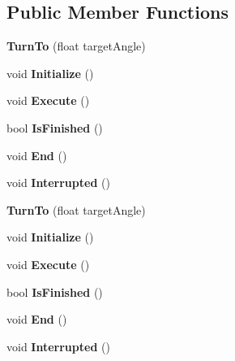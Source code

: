 \subsection*{Public Member Functions}
\begin{DoxyCompactItemize}
\item 
\hypertarget{class_turn_to_aa74a4bd0785dce24fdda1e1bf79cd39b}{}{\bfseries Turn\+To} (float target\+Angle)\label{class_turn_to_aa74a4bd0785dce24fdda1e1bf79cd39b}

\item 
\hypertarget{class_turn_to_a1573bc8d8345d2dbe40866937d4e41a1}{}void {\bfseries Initialize} ()\label{class_turn_to_a1573bc8d8345d2dbe40866937d4e41a1}

\item 
\hypertarget{class_turn_to_ae60afcdabfc0510abf2718f89919e8df}{}void {\bfseries Execute} ()\label{class_turn_to_ae60afcdabfc0510abf2718f89919e8df}

\item 
\hypertarget{class_turn_to_a645fa93286ea2657ec45166ec9a10662}{}bool {\bfseries Is\+Finished} ()\label{class_turn_to_a645fa93286ea2657ec45166ec9a10662}

\item 
\hypertarget{class_turn_to_a22e332211c9979bc29d408299f5d6188}{}void {\bfseries End} ()\label{class_turn_to_a22e332211c9979bc29d408299f5d6188}

\item 
\hypertarget{class_turn_to_a89e338cc7fd550fb0f2e6fb75698ae05}{}void {\bfseries Interrupted} ()\label{class_turn_to_a89e338cc7fd550fb0f2e6fb75698ae05}

\item 
\hypertarget{class_turn_to_aa74a4bd0785dce24fdda1e1bf79cd39b}{}{\bfseries Turn\+To} (float target\+Angle)\label{class_turn_to_aa74a4bd0785dce24fdda1e1bf79cd39b}

\item 
\hypertarget{class_turn_to_a1573bc8d8345d2dbe40866937d4e41a1}{}void {\bfseries Initialize} ()\label{class_turn_to_a1573bc8d8345d2dbe40866937d4e41a1}

\item 
\hypertarget{class_turn_to_ae60afcdabfc0510abf2718f89919e8df}{}void {\bfseries Execute} ()\label{class_turn_to_ae60afcdabfc0510abf2718f89919e8df}

\item 
\hypertarget{class_turn_to_a645fa93286ea2657ec45166ec9a10662}{}bool {\bfseries Is\+Finished} ()\label{class_turn_to_a645fa93286ea2657ec45166ec9a10662}

\item 
\hypertarget{class_turn_to_a22e332211c9979bc29d408299f5d6188}{}void {\bfseries End} ()\label{class_turn_to_a22e332211c9979bc29d408299f5d6188}

\item 
\hypertarget{class_turn_to_a89e338cc7fd550fb0f2e6fb75698ae05}{}void {\bfseries Interrupted} ()\label{class_turn_to_a89e338cc7fd550fb0f2e6fb75698ae05}

\end{DoxyCompactItemize}
